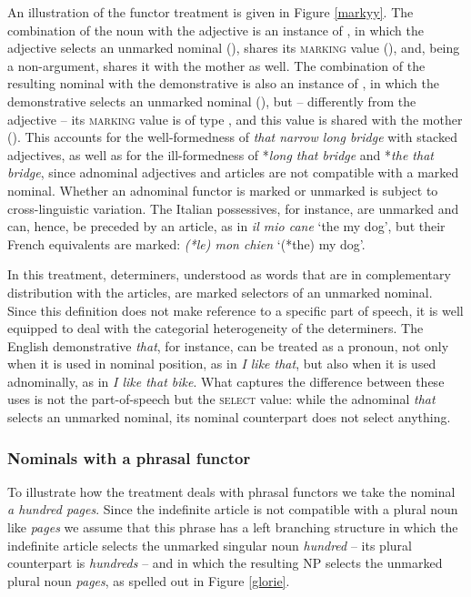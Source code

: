 \documentclass[output=paper
                ,modfonts
                ,nonflat
	        ,collection
	        ,collectionchapter
	        ,collectiontoclongg
 	        ,biblatex
                ,babelshorthands
                ,newtxmath
                ,draftmode
                ,colorlinks, citecolor=brown
]{./langsci/langscibook}
\begin{document}
An illustration of the functor treatment is given in Figure \ref{markyy}. 
The combination of the noun with the adjective is an instance of , 
in which the adjective selects an unmarked nominal (),  
shares its \textsc{marking} value (), and, being a non-argument, 
shares it with the mother as well. 
The combination of the resulting nominal with the demonstrative is also 
an instance of ,
in which the demonstrative selects an unmarked nominal (), 
but -- differently from the adjective -- its \textsc{marking} value is of type 
, and this value is shared with the mother ().    
This accounts for the well-formedness of \emph{that narrow long bridge} with stacked 
adjectives, as well as for the ill-formedness of 
*\emph{long that bridge} and *\emph{the that bridge}, since 
adnominal adjectives and articles are not compatible with a marked nominal.  
Whether an adnominal functor is marked or unmarked is subject to cross-linguistic variation. 
The Italian possessives, for instance, are unmarked and can, hence, be preceded 
by an article, as in \emph{il mio cane} `the my dog', but   
their French equivalents are marked: \emph{(*le) mon chien} `(*the) my dog'. 

In this treatment, determiners, understood as words that are in complementary distribution with 
the articles, are marked selectors of an unmarked nominal. Since this definition does not 
make reference to a specific part of speech, it is well equipped to deal with the categorial 
heterogeneity of the determiners. The English demonstrative \emph{that}, for instance, 
can be treated as a pronoun, not only when it is used in nominal position, as in 
\emph{I like that}, but also when it is used adnominally, as in \emph{I like that bike}.   
What captures the difference between these uses is not the part-of-speech but  
the \textsc{select} value: while the adnominal \emph{that} selects an unmarked nominal, 
its nominal counterpart does not select anything.      

        
\subsubsection{Nominals with a phrasal functor} 
\label{sec-phrasal-spec}


To illustrate how the treatment deals with phrasal functors we 
take the nominal \emph{a hundred pages}. Since the indefinite article is not 
compatible with a plural noun like \emph{pages} we assume that this phrase  
has a left branching structure in which the indefinite article selects 
the unmarked singular noun \emph{hundred} -- its plural counterpart is \emph{hundreds} --  
and in which the resulting NP selects the unmarked plural noun 
\emph{pages}, as spelled out in Figure \ref{glorie}. 
 
\end{document}

